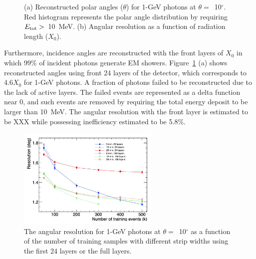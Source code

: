 \documentclass[preprint,12pt,times,a4paper]{elsarticle}
\begin{document}
\begin{figure}[!hbt]
\caption{ (a) Reconstructed polar angles ($\theta$) for 1-GeV photons at $\theta=$~10$^{\circ}$. Red histogram represents the polar angle distribution by requiring $E_{\rm{tot}}>$~10~MeV. (b) Angular resolution as a function of radiation length ($X_{0}$).}
\label{fig:angle_reco_layer}
\end{figure}

Furthermore, incidence angles are reconstructed with the front layers of $X_{0}$ in which 99\% of incident photons generate EM showers. Figure~\ref{fig:angle_reco_layer} (a) shows reconstructed angles using front 24 layers of the detector, which corresponds to 4.6$X_{0}$ for 1-GeV photons. A fraction of photons failed to be reconstructed due to the lack of active layers. The failed events are represented as a delta function near 0, and such events are removed by requiring the total energy deposit to be larger than 10~MeV. The angular resolution with the front layer is estimated to be XXX while possessing inefficiency estimated to be 5.8\%.

\begin{figure}[!hbt]
\includegraphics[width=0.6\textwidth]{figures/layer-event.jpg}
\caption{ The angular resolution for 1-GeV photons at $\theta=$~10$^{\circ}$ as a function of the number of training samples with different strip widths using the first 24 layers or the full layers. }
\label{fig:multi-parameter}
\end{figure}
\end{document}
